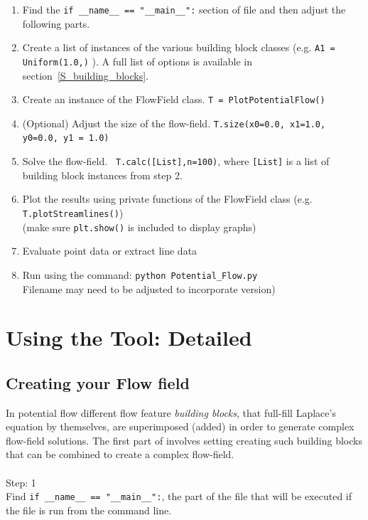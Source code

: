 \documentclass[10pt,a4paper]{article}
\begin{document}
\begin{enumerate}
\item Find the \verb'if __name__ == "__main__":' section of file and then adjust the following parts.
\item Create a list of instances of the various building block classes (e.g. \verb'A1 = Uniform(1.0,)' ). 
A full list of options is available in section~\ref{S_building_blocks}.
\item Create an instance of the FlowField class. \verb'T = PlotPotentialFlow()'
\item (Optional) Adjust the size of the flow-field. \verb'T.size(x0=0.0, x1=1.0, y0=0.0, y1 = 1.0)'
\item Solve the flow-field. \verb' T.calc([List],n=100)', where \verb'[List]' is a list of building block instances from step 2.
\item Plot the results using private functions of the FlowField class (e.g. \verb'T.plotStreamlines()') \\
(make sure \verb'plt.show()' is included to display graphs)
\item Evaluate point data or extract line data
\item Run using the command: \verb'python Potential_Flow.py' \\
Filename may need to be adjusted to incorporate version)   
\end{enumerate}



\section{Using the Tool: Detailed}

\subsection{Creating your Flow field}
In potential flow different flow feature {\it building blocks}, that full-fill Laplace's equation by themselves, are superimposed (added) in order to generate complex flow-field solutions. 
The first part of involves setting creating such building blocks that can be combined to create a complex flow-field.
\\ \\
\noindent
{\LARGE Step: 1}\\
Find  \verb'if __name__ == "__main__":', the part of the file that will be executed if the file is run from the command line.
\\ \\
\end{document}
